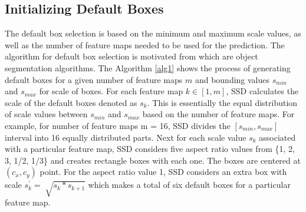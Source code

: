 \documentclass[conference]{IEEEtran}
\begin{document}
\subsection{Initializing Default Boxes}
The default box selection is based on the minimum and maximum scale values, as well as the number of feature maps needed to be used for the prediction. The algorithm for default box selection is motivated from \cite{DBLP:journals/corr/LongSD14,DBLP:journals/corr/HariharanAGM14a,DBLP:journals/corr/LiuRB15} which are object segmentation algorithms. The Algorithm \ref{alg1} shows the process of generating default boxes for a given number of feature maps $m$ and bounding values $s_{min}$ and $s_{max}$ for scale of boxes. For each feature map $k \in [1, m]$, SSD calculates the scale of the default boxes denoted as $s_k$. This is essentially the equal distribution of scale values between $s_{min}$ and $s_{max}$ based on the number of feature maps. For example, for number of feature maps m = 16, SSD divides the $[s_{min}, s_{max}]$ interval into 16 equally distributed parts. Next for each scale value $s_k$ associated with a particular feature map, SSD considers five aspect ratio values from \{1, 2, 3, 1/2, 1/3\} and creates rectangle boxes with each one. The boxes are centered at $(c_x, c_y)$ point. For the aspect ratio value 1, SSD considers an extra box with scale $s{^{'} _k} = \sqrt[]{s_k * s_{k+1}}$ which makes a total of six default boxes for a particular feature map. 
\end{document}
